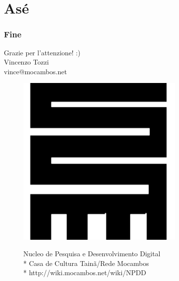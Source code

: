 \documentclass{beamer}
\begin{document}
\section{Asé}

\begin{frame}
 \frametitle{Fine}
 \begin{center}
   \huge Grazie per l'attenzione! :) \\
   \vfill
   \large  
   Vincenzo Tozzi \\
   \normalsize
   vince@mocambos.net
   \vfill
   \begin{figure}[htb]
     \begin{minipage}[c]{0.10\textwidth}
       \includegraphics[width=\textwidth]{./Figure/NPDD.pdf}
  \end{minipage}
  \begin{minipage}[c]{0.60\textwidth}
    \footnotesize
    Nucleo de Pesquisa e Desenvolvimento Digital \\*
    Casa de Cultura Tainã/Rede Mocambos\\*
    http://wiki.mocambos.net/wiki/NPDD
  \end{minipage}

\end{figure}
\end{center}
\end{frame}
\end{document}
